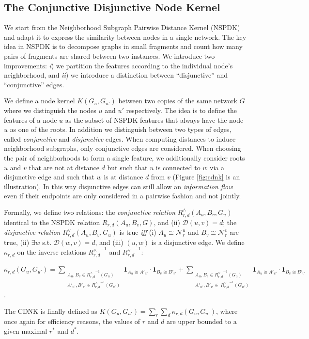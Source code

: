 \documentclass[review]{elsarticle}
\begin{document}
\subsection{The Conjunctive Disjunctive Node Kernel}
We start from the Neighborhood Subgraph Pairwise Distance Kernel (NSPDK) \cite{costa2010fast} and adapt it to express the similarity between nodes in a single network. The key idea in NSPDK is to decompose graphs in small fragments and count how many pairs of fragments are shared between two instances. We introduce two improvements: \textit{i}) we partition the features according to the individual node's neighborhood, and \textit{ii}) we introduce a  distinction between ``disjunctive'' and ``conjunctive'' edges.

We define a node kernel $K(G_u,G_{u'})$ between two copies of the same network $G$ where we distinguish the nodes $u$ and $u'$ respectively. The idea is to define the features of a node $u$ as the subset of NSPDK features that always have the node $u$ as one of the roots. In addition we distinguish between two types of edges, called {\em conjunctive} and {\em disjunctive} edges. When computing distances to induce neighborhood subgraphs, only conjunctive edges are considered. When choosing the
pair of neighborhoods to form a single feature, we additionally consider roots $u$ and $v$ that are not at distance $d$ but such that $u$ is connected to $w$ via a disjunctive edge and such that $w$ is at distance $d$ from $v$ (Figure \ref{fig:cdnk} is an illustration). In this way disjunctive edges can still allow an {\em information flow} even if their
endpoints are only considered in a pairwise fashion and not jointly. 

Formally, we define two relations: the \textit{conjunctive relation} $R^{\wedge}_{r,d}(A_u, B_v, G_u)$ identical to the NSPDK relation $R_{r,d}(A_u, B_v, G)$,  and (ii) $\mathcal{D}(u,v)= d$; the \textit{disjunctive relation} $R_{r,d}^{\vee}(A_u, B_v, G_u)$ is true {\em iff} (i)  $A_u \cong \mathcal{N}_r^u$ and $B_v \cong \mathcal{N}_r^v$ are true, (ii) $\exists w$ s.t. $\mathcal{D}(w,v)= d$, and (iii) $(u,w)$ is a disjunctive edge. We define $\kappa_{r,d}$ on the  inverse relations ${R^{\wedge}_{r,d}}^{ -1}$ and ${R^{\vee}_{r,d}}^{ -1}$:
\begin{center}
 $\kappa_{r,d}(G_u,G_{u'}) = \!\!\!\!\!\!\!\!\!\!\!\!
 \sum\limits_{\substack {A_u,{B}_{v} \in {R_{r,d}^{\wedge}}^{ -1}(G_u) \\ A'_{u'},{B'}_{v'} \in {R_{r,d}^{\wedge}}^{ -1}(G_{u'}) }} \!\!\!\!\!\!\!\!\!\!\!\!
  { \textbf{1}_{A_u \cong A'_{u'}} \cdot { \textbf{1}_{B_{v} \cong B'_{v'}}}}
+ \!\!\!\!\!\!\!\!\!\!\!\!
 \sum\limits_{\substack {A_u,{B}_{v} \in {R_{r,d}^{\vee}}^{ -1}(G_u) \\
  A'_{u'},{B'}_{v'} \in \ {R_{r,d}^{\vee}}^{ -1}(G_{u'}) }} \!\!\!\!\!\!\!\!\!\!\!\!
  { \textbf{1}_{A_u \cong A'_{u'}} \cdot { \textbf{1}_{B_{v} \cong B'_{v'}}}}
  $.
\end{center}
The CDNK is finally defined as $K(G_u,G_{u'}) = \sum\limits_{r}{\sum\limits_{d}{\kappa_{r,d}(G_u,G_{u'})}}$, where once again for efficiency reasons, the values of $r$ and $d$ are upper bounded to a given maximal $r^*$ and $d^*$.
\end{document}
